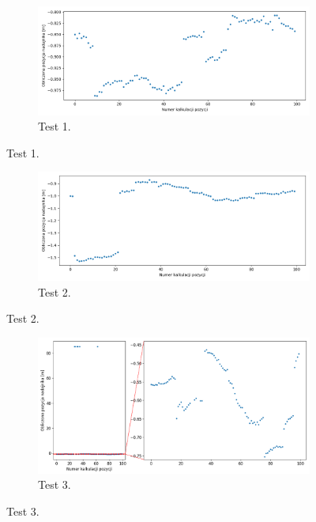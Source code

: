 \begin{figure}[H]
    \centering
    \begin{subfigure}{\textwidth}\label{fig:position_0}
        \centering
        \includegraphics[width=\linewidth]{pics/position/position_0.png}
        \caption{Test 1.}
    \end{subfigure}
\end{figure}
\begin{figure}[H]
    \ContinuedFloat\centering
    \begin{subfigure}{\textwidth}\label{fig:position_1}
        \centering
        \includegraphics[width=\linewidth]{pics/position/position_1.png}
        \caption{Test 2.}
    \end{subfigure}
\end{figure}
\begin{figure}[H]
    \ContinuedFloat\centering
    \begin{subfigure}{\textwidth}\label{fig:position_2}
        \centering
        \includegraphics[width=\linewidth]{pics/position/position_2.png}
        \caption{Test 3.}
    \end{subfigure}
\end{figure}
